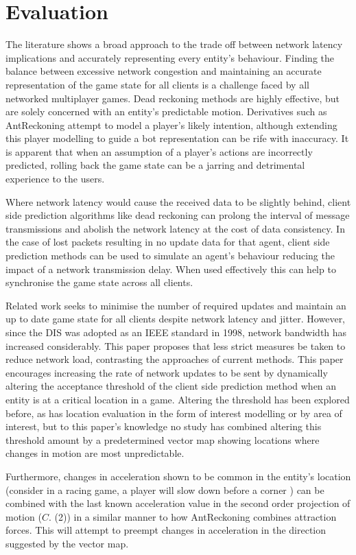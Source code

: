 \documentclass[journal]{IEEEtran}
\begin{document}
\section{Evaluation}

The literature shows a broad approach to the trade off between network latency implications and accurately representing every entity's behaviour. Finding the balance between excessive network congestion and maintaining an accurate representation of the game state for all clients is a challenge faced by all networked multiplayer games. Dead reckoning methods are highly effective, but are solely concerned with an entity's predictable motion. Derivatives such as AntReckoning attempt to model a player's likely intention, although extending this player modelling to guide a bot representation can be rife with inaccuracy. It is apparent that when an assumption of a player's actions are incorrectly predicted, rolling back the game state can be a jarring and detrimental experience to the users.

Where network latency would cause the received data to be slightly behind, client side prediction algorithms like dead reckoning can prolong the interval of message transmissions and abolish the network latency at the cost of data consistency. In the case of lost packets resulting in no update data for that agent, client side prediction methods can be used to simulate an agent's behaviour reducing the impact of a network transmission delay. When used effectively this can help to synchronise the game state across all clients.

Related work seeks to minimise the number of required updates and maintain an up to date game state for all clients despite network latency and jitter. However, since the DIS was adopted as an IEEE standard in 1998, network bandwidth has increased considerably. This paper proposes that less strict measures be taken to reduce network load, contrasting the approaches of current methods. This paper encourages increasing the rate of network updates to be sent by dynamically altering the acceptance threshold of the client side prediction method when an entity is at a critical location in a game. Altering the threshold has been explored before, as has location evaluation in the form of interest modelling or by area of interest, but to this paper's knowledge no study has combined altering this threshold amount by a predetermined vector map showing locations where changes in motion are most unpredictable.

Furthermore, changes in acceleration shown to be common in the entity's location (consider in a racing game, a player will slow down before a corner \cite{larsson2016movement}) can be combined with the last known acceleration value in the second order projection of motion ($C.$ (2)) in a similar manner to how AntReckoning combines attraction forces. This will attempt to preempt changes in acceleration in the direction suggested by the vector map.
\end{document}
